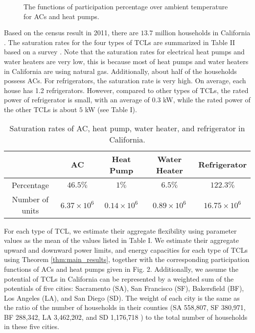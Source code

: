 \documentclass[onecolumn,journal]{IEEEtran}
\begin{document}
\begin{figure}[tb]
\centering
{}
\caption{The functions of participation percentage over ambient temperature for ACs and heat pumps. } \label{fig:participation_vs_temp}
\end{figure}

Based on the census result in 2011, there are $13.7$ million households in California \cite{CA_census}. The saturation rates for the four types of \acp{TCL} are summarized in Table II based on a survey \cite{CA_applicance}. Note that the saturation rates for electrical heat pumps and water heaters are very low, this is because most of heat pumps and water heaters in California are using natural gas. Additionally, about half of the households possess ACs. For refrigerators,  the saturation rate is very high. On average, each house has 1.2 refrigerators. However, compared to other types of \acp{TCL}, the rated power of refrigerator is small, with an average of $0.3$ kW, while the rated power of the other \acp{TCL} is about $5$ kW (see Table I). 

\begin{table}[tb]
\caption{Saturation rates of AC, heat pump, water heater, and refrigerator in California.}
\label{tab:saturation}
{\scriptsize
\begin{center}
\begin{tabular}{c||c|c|c|c}
     & AC & Heat Pump &  Water Heater & Refrigerator \\
\hline \hline
{\scriptsize Percentage} & {\scriptsize $46.5 \%$} & {\scriptsize $1 \%$}& {\scriptsize$6.5\%$}  & {\scriptsize $122.3\%$} \\
{\scriptsize Number of units} & {\scriptsize $6.37\times10^6$} & {\scriptsize$0.14 \times10^6$}  & {\scriptsize $0.89\times10^6$} & {\scriptsize $16.75\times10^6$}\\
\end{tabular}
\end{center}
}
\end{table}

For each type of \ac{TCL}, we estimate their aggregate flexibility using parameter values as the mean of the values listed in Table I. We estimate their aggregate upward and downward power limits, and energy capacities for each type of \acp{TCL} using Theorem \ref{thm:main_results}, together with the corresponding participation functions of ACs and heat pumps given in Fig.  2.  Additionally, we assume the potential of TCLs in California can be represented by a weighted sum of the potentials of five cities: Sacramento (SA), San Francisco (SF), Bakersfield (BF), Los Angeles (LA), and San Diego (SD). The weight of each city is the same as the ratio of the number of households in their counties (SA 558,807, SF 380,971, BF 288,342, LA 3,462,202, and SD 1,176,718 \cite{CA_census}) to the total number of households in these five cities.
\end{document}
